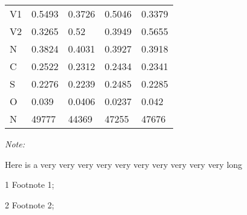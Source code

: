 \begin{table}
\begin{threeparttable}
\begin{tabular}[t]{lllll}
\hspace{1em}V1 & 0.5493 & 0.3726 & 0.5046 & 0.3379\\
\hspace{1em}V2 & 0.3265 & 0.52 & 0.3949 & 0.5655\\
\hspace{1em}N & 0.3824 & 0.4031 & 0.3927 & 0.3918\\
\hspace{1em}C & 0.2522 & 0.2312 & 0.2434 & 0.2341\\
\hspace{1em}S & 0.2276 & 0.2239 & 0.2485 & 0.2285\\
\hspace{1em}O & 0.039 & 0.0406 & 0.0237 & 0.042\\
N & 49777 & 44369 & 47255 & 47676\\
\bottomrule
\end{tabular}
\begin{tablenotes}
\item \textit{Note: } 
\item Here is a very very very very very very very very very very long
\item[1] Footnote 1; 
\item[2] Footnote 2; 
\end{tablenotes}
\end{threeparttable}
\end{table}
